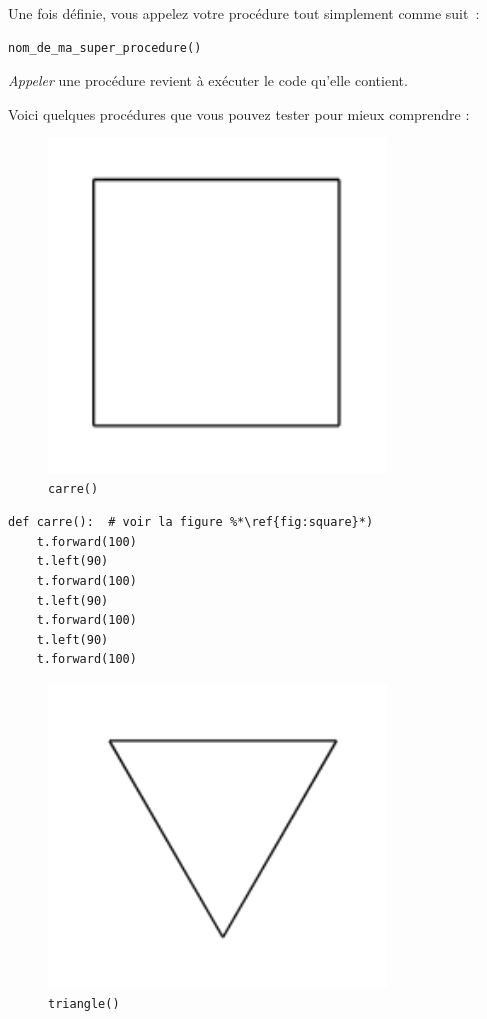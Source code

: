 \documentclass[11pt,a4paper]{article}
\begin{document}
Une fois définie, vous appelez votre procédure tout simplement comme
suit~:

\begin{lstlisting}
nom_de_ma_super_procedure()
\end{lstlisting}

\emph{Appeler} une procédure revient à exécuter le code qu'elle contient.

Voici quelques procédures que vous pouvez tester pour mieux comprendre :

\begin{figure}
    \centering
    \includegraphics[width=0.8\textwidth]{img/square}
    \caption{\lstinline{carre()}}
    \label{fig:square}
\end{figure}

\begin{lstlisting}[float]
def carre():  # voir la figure %*\ref{fig:square}*)
    t.forward(100)
    t.left(90)
    t.forward(100)
    t.left(90)
    t.forward(100)
    t.left(90)
    t.forward(100)
\end{lstlisting}
\newpage

\begin{figure}
    \centering
    \includegraphics[width=0.8\textwidth]{img/triangle}
    \caption{\lstinline{triangle()}}
    \label{fig:triangle}
\end{figure}
\end{document}
